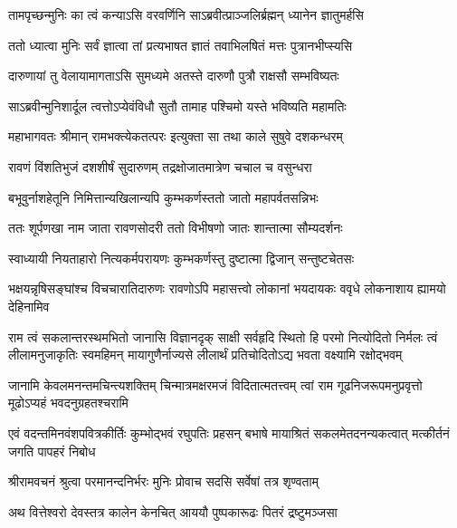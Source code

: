 \twolineshloka
{तामपृच्छन्मुनिः का त्वं कन्याऽसि वरवर्णिनि}
{साऽब्रवीत्प्राञ्जलिर्ब्रह्मन् ध्यानेन ज्ञातुमर्हसि} %

\twolineshloka
{ततो ध्यात्वा मुनिः सर्वं ज्ञात्वा तां प्रत्यभाषत}
{ज्ञातं तवाभिलषितं मत्तः पुत्रानभीप्स्यसि} %

\twolineshloka
{दारुणायां तु वेलायामागताऽसि सुमध्यमे}
{अतस्ते दारुणौ पुत्रौ राक्षसौ सम्भविष्यतः} %

\twolineshloka
{साऽब्रवीन्मुनिशार्दूल त्वत्तोऽप्येवंविधौ सुतौ}
{तामाह पश्चिमो यस्ते भविष्यति महामतिः} %

\twolineshloka
{महाभागवतः श्रीमान् रामभक्त्येकतत्परः}
{इत्युक्ता सा तथा काले सुषुवे दशकन्धरम्} %

\twolineshloka
{रावणं विंशतिभुजं दशशीर्षं सुदारुणम्}
{तद्रक्षोजातमात्रेण चचाल च वसुन्धरा} %

\twolineshloka
{बभूवुर्नाशहेतूनि निमित्तान्यखिलान्यपि}
{कुम्भकर्णस्ततो जातो महापर्वतसन्निभः} %

\twolineshloka
{ततः शूर्पणखा नाम जाता रावणसोदरी}
{ततो विभीषणो जातः शान्तात्मा सौम्यदर्शनः} %

\twolineshloka
{स्वाध्यायी नियताहारो नित्यकर्मपरायणः}
{कुम्भकर्णस्तु दुष्टात्मा द्विजान् सन्तुष्टचेतसः} %

\threelineshloka
{भक्षयन्नृषिसङ्घांश्च विचचारातिदारुणः}
{रावणोऽपि महासत्त्वो लोकानां भयदायकः}
{ववृधे लोकनाशाय ह्यामयो देहिनामिव} %

\fourlineindentedshloka
{राम त्वं सकलान्तरस्थमभितो जानासि विज्ञानदृक्}
{साक्षी सर्वहृदि स्थितो हि परमो नित्योदितो निर्मलः}
{त्वं लीलामनुजाकृतिः स्वमहिमन् मायागुणैर्नाज्यसे}
{लीलार्थं प्रतिचोदितोऽद्य भवता वक्ष्यामि रक्षोद्भवम्} %

\fourlineindentedshloka
{जानामि केवलमनन्तमचिन्त्यशक्तिम्}
{चिन्मात्रमक्षरमजं विदितात्मतत्त्वम्}
{त्वां राम गूढनिजरूपमनुप्रवृत्तो}
{मूढोऽप्यहं भवदनुग्रहतश्चरामि} %

\fourlineindentedshloka
{एवं वदन्तमिनवंशपवित्रकीर्तिः}
{कुम्भोद्भवं रघुपतिः प्रहसन् बभाषे}
{मायाश्रितं सकलमेतदनन्यकत्वात्}
{मत्कीर्तनं जगति पापहरं निबोध} %






\twolineshloka
{श्रीरामवचनं श्रुत्वा परमानन्दनिर्भरः}
{मुनिः प्रोवाच सदसि सर्वेषां तत्र शृण्वताम्} %

\twolineshloka
{अथ वित्तेश्वरो देवस्तत्र कालेन केनचित्}
{आययौ पुष्पकारूढः पितरं द्रष्टुमञ्जसा} %


